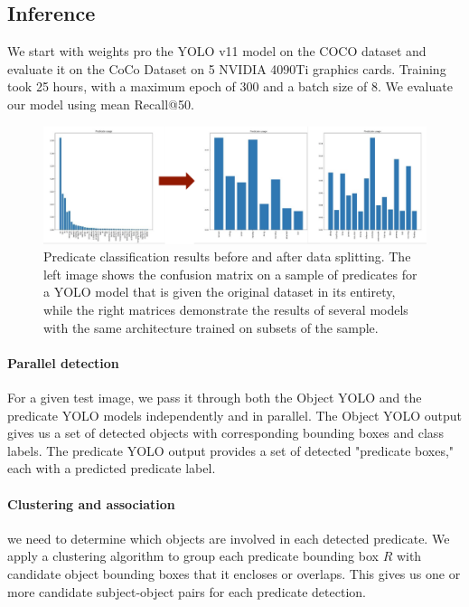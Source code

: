 \documentclass{article}
\begin{document}
\subsection{Inference}
We start with weights pro the YOLO v11 model on the COCO dataset and evaluate it on the CoCo Dataset on 5 NVIDIA 4090Ti graphics cards. Training took 25 hours, with a maximum epoch of 300 and a batch size of 8. 
We evaluate our model using mean Recall@50.

\begin{figure}
    \includegraphics[width=\textwidth]{figures/figure2.png}
  \centering
  \caption{Predicate classification results before and after data splitting. The left image shows the confusion matrix on a sample of predicates for a YOLO model that is given the original dataset in its entirety, while the right matrices demonstrate the results of several models with the same architecture trained on subsets of the sample.}
\end{figure}

\paragraph{Parallel detection}
For a given test image, we pass it through both the Object YOLO and the predicate YOLO models independently and in parallel. The Object YOLO output gives us a set of detected objects with corresponding bounding boxes and class labels. The predicate YOLO output provides a set of detected "predicate boxes," each with a predicted predicate label.

\paragraph{Clustering and association}
we need to determine which objects are involved in each detected predicate. We apply a clustering algorithm to group each predicate bounding box $R$ with candidate object bounding boxes that it encloses or overlaps. This gives us one or more candidate subject-object pairs for each predicate detection.
\end{document}
